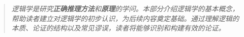 \begin{quote}
\textit{逻辑学是研究\textbf{正确推理方法}和\textbf{原理}的学问。本部分介绍逻辑学的基本概念，帮助读者建立对逻辑学的初步认识，为后续内容奠定基础。通过理解逻辑的本质、论证的结构以及常见谬误，读者将能够识别和构建有效的论证。}
\end{quote}
